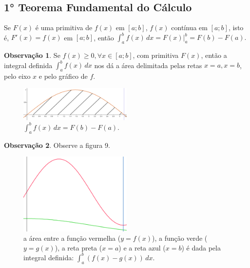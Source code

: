 \documentclass{article}
\begin{document}
{\begin{newpage}
\subsection{1° Teorema Fundamental do Cálculo}
\hspace{12pt} Se $F(x)$ é uma primitiva de $f(x)$ em $[a;b]$, $f(x)$ contínua em $[a;b]$,  isto é, $F'(x) = f(x)$ em $[a;b]$, então $\displaystyle{\int_{a}^{b} f(x)\, dx = F(x) \Big|^{b}_{a} = F(b) - F(a) .}$
\par
\vspace{0.3cm}
\textbf{Observação 1}. Se $f(x)\geq 0, \forall x\in [a;b]$, com primitiva $F(x)$, então a integral definida $\displaystyle{\int_{a}^{b} f(x)\, dx}$ nos dá a área delimitada pelas retas $x=a, x=b$, pelo eixo $x$ e pelo gráfico de $f$.
\begin{figure}[htbp]
\begin{center}
\includegraphics[width=0.5\textwidth, angle=0]{Grafico10.png}
\end{center}
\caption{$\displaystyle{\int_{a}^{b} f(x)\, dx = F(b) - F(a)}$.}
\end{figure}  
\par
\vspace{0.3cm}
\textbf{Observação 2}. Observe a figura 9.
\begin{figure}[htbp]
\begin{center}
\includegraphics[width=0.5\textwidth, angle=0]{Grafico11.png}
\end{center}
\caption{a área entre a função vermelha ($y=f(x)$), a função verde ($y=g(x)$), a reta preta ($x=a$) e a reta azul ($x=b$) é dada pela integral definida: $\displaystyle{\int_{a}^{b} (f(x) - g(x))\, dx}$. }
\end{figure}
\par
\vspace{0.3cm}

\end{newpage}}
\end{document}
